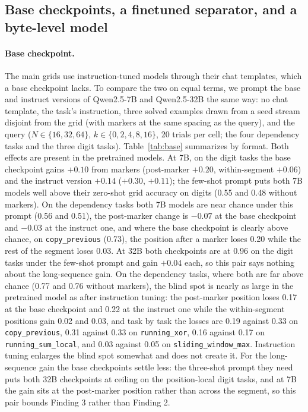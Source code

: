\documentclass[10pt]{article} %
\newcommand{\task}[1]{\texttt{#1}}
\begin{document}
\subsection{Base checkpoints, a finetuned separator, and a byte-level model}
\label{app:base}

\paragraph{Base checkpoint.} The main grids use instruction-tuned models through their chat templates, which a base checkpoint lacks. To compare the two on equal terms, we prompt the base and instruct versions of Qwen2.5-7B and Qwen2.5-32B the same way: no chat template, the task's instruction, three solved examples drawn from a seed stream disjoint from the grid (with markers at the same spacing as the query), and the query ($N \in \{16, 32, 64\}$, $k \in \{0, 2, 4, 8, 16\}$, 20 trials per cell; the four dependency tasks and the three digit tasks). Table~\ref{tab:base} summarizes by format. Both effects are present in the pretrained models. At 7B, on the digit tasks the base checkpoint gains $+0.10$ from markers (post-marker $+0.20$, within-segment $+0.06$) and the instruct version $+0.14$ ($+0.30$, $+0.11$); the few-shot prompt puts both 7B models well above their zero-shot grid accuracy on digits (0.55 and 0.48 without markers). On the dependency tasks both 7B models are near chance under this prompt (0.56 and 0.51), the post-marker change is $-0.07$ at the base checkpoint and $-0.03$ at the instruct one, and where the base checkpoint is clearly above chance, on \task{copy\_previous} (0.73), the position after a marker loses 0.20 while the rest of the segment loses 0.03. At 32B both checkpoints are at 0.96 on the digit tasks under the few-shot prompt and gain $+0.04$ each, so this pair says nothing about the long-sequence gain. On the dependency tasks, where both are far above chance (0.77 and 0.76 without markers), the blind spot is nearly as large in the pretrained model as after instruction tuning: the post-marker position loses 0.17 at the base checkpoint and 0.22 at the instruct one while the within-segment positions gain 0.02 and 0.03, and task by task the losses are 0.19 against 0.33 on \task{copy\_previous}, 0.31 against 0.33 on \task{running\_xor}, 0.16 against 0.17 on \task{running\_sum\_local}, and 0.03 against 0.05 on \task{sliding\_window\_max}. Instruction tuning enlarges the blind spot somewhat and does not create it. For the long-sequence gain the base checkpoints settle less: the three-shot prompt they need puts both 32B checkpoints at ceiling on the position-local digit tasks, and at 7B the gain sits at the post-marker position rather than across the segment, so this pair bounds Finding 3 rather than Finding 2.
\end{document}
